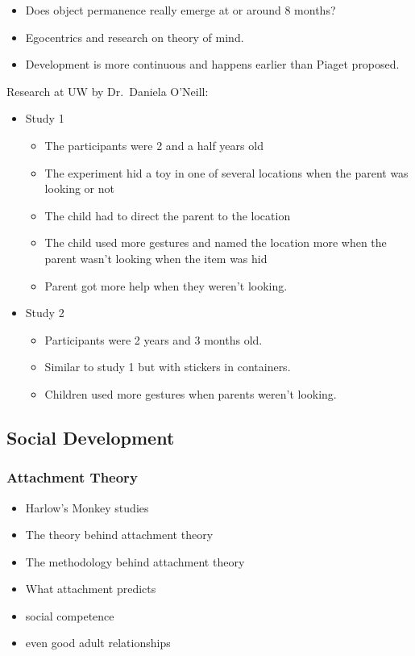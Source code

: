 \documentclass[12pt]{article}
\begin{document}
\begin{itemize}
    \item Does object permanence really emerge at or around 8 months?
    \item Egocentrics and research on theory of mind.
    \item Development is more continuous and happens earlier than Piaget
        proposed.
\end{itemize}

Research at UW by Dr.\ Daniela O'Neill:
\begin{itemize}
    \item Study 1
        \begin{itemize}
            \item The participants were 2 and a half years old
            \item The experiment hid a toy in one of several locations when the
                parent was looking or not
            \item The child had to direct the parent to the location
            \item The child used more gestures and named the location more when
                the parent wasn't looking when the item was hid
            \item Parent got more help when they weren't looking.
        \end{itemize}
    \item Study 2
        \begin{itemize}
            \item Participants were 2 years and 3 months old.
            \item Similar to study 1 but with stickers in containers.
            \item Children used more gestures when parents weren't looking.
        \end{itemize}
\end{itemize}

\subsection{Social Development}

\subsubsection{Attachment Theory}

\begin{itemize}
    \item Harlow's Monkey studies
    \item The theory behind attachment theory
    \item The methodology behind attachment theory
    \item What attachment predicts
    \item social competence
    \item even good adult relationships
\end{itemize}
\end{document}
